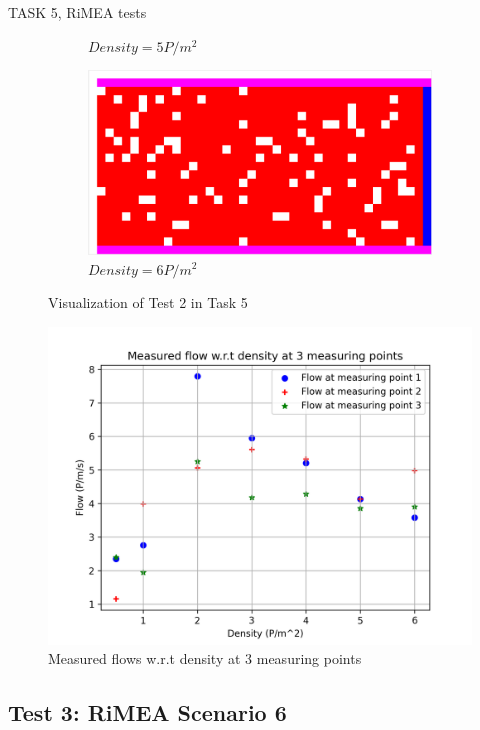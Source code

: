 \documentclass[10pt,a4paper]{article}
\begin{document}
\begin{task}{TASK 5, RiMEA tests}
\begin{figure}[htbp]
\begin{subfigure}[b]{0.31\textwidth}
    \caption{$Density = 5 P/m^2$}
    \label{fig:test2_5}
  \end{subfigure}  
  \begin{subfigure}[b]{0.31\textwidth}
    \includegraphics[width=\textwidth]{pictures/test2_6.png}
    \caption{$Density = 6 P/m^2$}
    \label{fig:test2_6}
  \end{subfigure}  
  \caption{Visualization of Test 2 in Task 5}
  \label{fig:test2}
\end{figure}

\begin{figure}[htbp]
      \centering
      \includegraphics[width=0.9\linewidth]{pictures/measured_flow_density.png}
      \caption{Measured flows w.r.t density at 3 measuring points}
      \label{fig:measured_flow_density}
\end{figure}

\subsection{Test 3: RiMEA Scenario 6}


\end{task}
\end{document}
